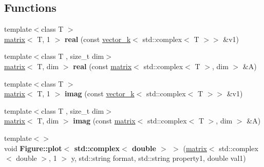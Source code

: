 \subsection*{Functions}
\begin{DoxyCompactItemize}
\item 
\hypertarget{namespacekeycpp_ae84fcdbb1d5010c9e67a02851edd4460}{{\footnotesize template$<$class T $>$ }\\\hyperlink{classkeycpp_1_1matrix}{matrix}$<$ T, 1 $>$ {\bfseries real} (const \hyperlink{classkeycpp_1_1vector__k}{vector\-\_\-k}$<$ std\-::complex$<$ T $>$$>$ \&v1)}\label{namespacekeycpp_ae84fcdbb1d5010c9e67a02851edd4460}

\item 
\hypertarget{namespacekeycpp_a6ab8937a6378526f7514c6124fb9991a}{{\footnotesize template$<$class T , size\-\_\-t dim$>$ }\\\hyperlink{classkeycpp_1_1matrix}{matrix}$<$ T, dim $>$ {\bfseries real} (const \hyperlink{classkeycpp_1_1matrix}{matrix}$<$ std\-::complex$<$ T $>$, dim $>$ \&A)}\label{namespacekeycpp_a6ab8937a6378526f7514c6124fb9991a}

\item 
\hypertarget{namespacekeycpp_ac70fdb60acaa9b85c49cdd36ac68a6ae}{{\footnotesize template$<$class T $>$ }\\\hyperlink{classkeycpp_1_1matrix}{matrix}$<$ T, 1 $>$ {\bfseries imag} (const \hyperlink{classkeycpp_1_1vector__k}{vector\-\_\-k}$<$ std\-::complex$<$ T $>$$>$ \&v1)}\label{namespacekeycpp_ac70fdb60acaa9b85c49cdd36ac68a6ae}

\item 
\hypertarget{namespacekeycpp_a026d42394a53ae81f292d1e3de4383cb}{{\footnotesize template$<$class T , size\-\_\-t dim$>$ }\\\hyperlink{classkeycpp_1_1matrix}{matrix}$<$ T, dim $>$ {\bfseries imag} (const \hyperlink{classkeycpp_1_1matrix}{matrix}$<$ std\-::complex$<$ T $>$, dim $>$ \&A)}\label{namespacekeycpp_a026d42394a53ae81f292d1e3de4383cb}

\item 
\hypertarget{namespacekeycpp_a90b60f7fefe3931699f4d587a241c12e}{{\footnotesize template$<$$>$ }\\void {\bfseries Figure\-::plot$<$ std\-::complex$<$ double $>$ $>$} (\hyperlink{classkeycpp_1_1matrix}{matrix}$<$ std\-::complex$<$ double $>$, 1 $>$ y, std\-::string format, std\-::string property1, double val1)}\label{namespacekeycpp_a90b60f7fefe3931699f4d587a241c12e}


\end{DoxyCompactItemize}
